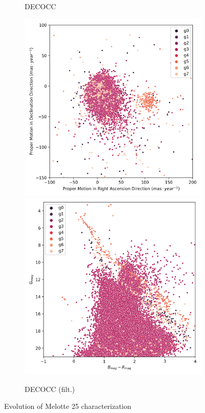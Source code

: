 \documentclass[11pt,a4paper,english,twocolumn]{article}
\begin{document}
\begin{figure}[!htp]
\begin{subfigure}[b]{0.3\textwidth}
      \caption{DECOCC}
  \end{subfigure}
  \medskip
  \begin{subfigure}[b]{0.3\textwidth}
    \centering
      \includegraphics[width=\textwidth]{../figures/melotte_25/dec_pm_filtered_melotte_25.png}
      \includegraphics[width=\textwidth]{../figures/melotte_25/dec_hr_diagram_filtered_melotte_25.png}
      \caption{DECOCC (filt.)}
  \end{subfigure}
  \caption{Evolution of Melotte 25 characterization}
  \label{fig:melotte_25_characterization_evolution}
\end{figure}
\end{document}
